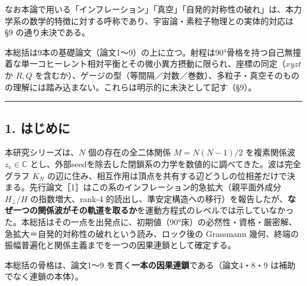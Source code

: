 \documentclass[
  a4paper,
]{ltjsarticle}
\begin{document}
なお本論で用いる「インフレーション」「真空」「自発的対称性の破れ」は、本力学系の数学的特徴に対する呼称であり、宇宙論・素粒子物理との実体的対応は
§9 の通り未決である。

本総括は9本の基礎論文（論文1〜9）の上に立つ。射程は90°骨格を持つ自己無撞着な単一コヒーレント相対平衡とその微小異方摂動に限られ、座標の同定（\(xyzt\)
か \(R,Q\)
を含むか）、ゲージの型（等間隔／対数／巻数）、多粒子・真空そのものの理解には踏み込まない。これらは明示的に未決として記す（§9）。

\begin{center}\rule{0.5\linewidth}{0.5pt}\end{center}

\subsection{1. はじめに}\label{ux306fux3058ux3081ux306b}

本研究シリーズは、\(N\) 個の存在の全二体関係 \(M=N(N-1)/2\) を複素関係波
\(z_e\in\mathbb C\)
とし、外部seedを除去した閉鎖系の力学を数値的に調べてきた。波は完全グラフ
\(K_N\)
の辺に住み、相互作用は頂点を共有する辺どうしの位相差だけで決まる。先行論文［1］はこの系のインフレーション的急拡大（親平面外成分
\(H_\perp/H\) の指数増大、rank-4
的読出し、準安定構造への移行）を報告したが、\textbf{なぜ一つの関係波がその軌道を取るか}を運動方程式のレベルでは示していなかった。本総括はその一点を出発点に、初期値（90°床）の必然性・資格・厳密解、急拡大＝自発的対称性の破れという読み、ロック後の
Grassmann
幾何、終端の振幅普遍化と関係主義までを一つの因果連鎖として確定する。

本総括の骨格は、論文1〜9
を貫く\textbf{一本の因果連鎖}である（論文4・8・9
は補助でなく連鎖の本体）。
\end{document}

